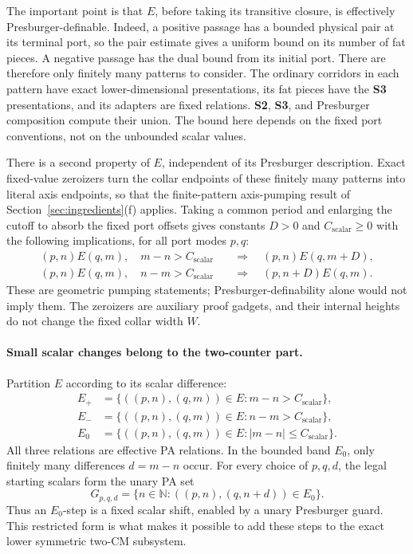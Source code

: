 \documentclass[11pt,a4paper]{article}
\theoremstyle{remark}
\newcommand{\N}{\mathbb N}
\newcommand{\Cs}{C_{\mathrm{scalar}}}
\begin{document}
The important point is that \(E\), before taking its transitive closure,
is effectively Presburger-definable.  Indeed, a positive passage has a
bounded physical pair at its terminal port, so the pair estimate gives
a uniform bound on its number of fat pieces.  A negative passage has
the dual bound from its initial port.  There are therefore only finitely
many patterns to consider.  The ordinary corridors in each pattern have
exact lower-dimensional presentations, its fat pieces have the
\textbf{S3} presentations, and its adapters are fixed relations.
\textbf{S2}, \textbf{S3}, and Presburger composition compute their union.
The bound here depends on the fixed port conventions, not on the
unbounded scalar values.

There is a second property of \(E\), independent of its Presburger
description.  Exact fixed-value zeroizers turn the collar endpoints of
these finitely many patterns into literal axis endpoints, so that the
finite-pattern axis-pumping result of
Section~\ref{sec:ingredients}(f) applies.  Taking a common period and
enlarging the cutoff to absorb the fixed port offsets gives constants
\(D>0\) and \(\Cs\geq0\) with the following implications, for all port
modes \(p,q\):
\begin{align}
 (p,n)E(q,m),\quad m-n>\Cs
 &\quad\Longrightarrow\quad (p,n)E(q,m+D),
 \label{eq:scalar-positive-pump}\\
 (p,n)E(q,m),\quad n-m>\Cs
 &\quad\Longrightarrow\quad (p,n+D)E(q,m).
 \label{eq:scalar-negative-pump}
\end{align}
These are geometric pumping statements; Presburger-definability alone
would not imply them.  The zeroizers are auxiliary proof gadgets, and
their internal heights do not change the fixed collar width \(W\).

\paragraph{Small scalar changes belong to the two-counter part.}
Partition \(E\) according to its scalar difference:
\[
\begin{aligned}
 E_+&=\{((p,n),(q,m))\in E:m-n>\Cs\},\\
 E_-&=\{((p,n),(q,m))\in E:n-m>\Cs\},\\
 E_0&=\{((p,n),(q,m))\in E:|m-n|\leq\Cs\}.
\end{aligned}
\]
All three relations are effective PA relations.  In the bounded band
\(E_0\), only finitely many differences \(d=m-n\) occur.  For every
choice of \(p,q,d\), the legal starting scalars form the unary PA set
\[
 G_{p,q,d}=\{n\in\N:((p,n),(q,n+d))\in E_0\}.
\]
Thus an \(E_0\)-step is a fixed scalar shift, enabled by a unary
Presburger guard.  This restricted form is what makes it possible to
add these steps to the exact lower symmetric two-CM subsystem.
\end{document}
